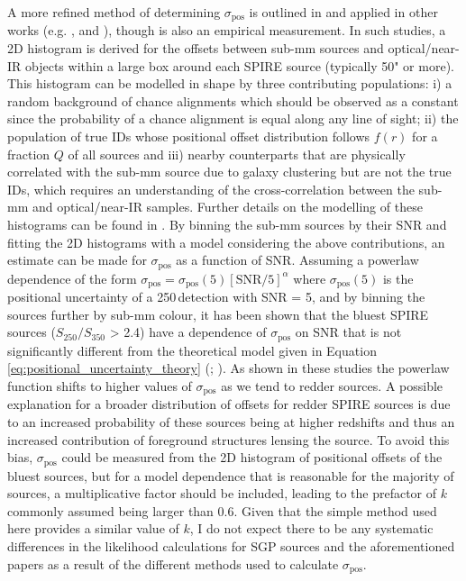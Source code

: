 A more refined method of determining $\sigma_{\textrm{pos}}$ is outlined in \citealt{Smith_2011} and applied in other works (e.g. \citealt{Bourne_2014}, \citealt{Bourne_2016} and \citealt{Furlanetto_2018}), though is also an empirical measurement. In such studies, a 2D histogram is derived for the offsets between sub-mm sources and optical/near-IR objects within a large box around each SPIRE source (typically 50" or more). This histogram can be modelled in shape by three contributing populations: i) a random background of chance alignments which should be observed as a constant since the probability of a chance alignment is equal along any line of sight; ii) the population of true IDs whose positional offset distribution follows $f(r)$ for a fraction $Q$ of all sources and iii) nearby counterparts that are physically correlated with the sub-mm source due to galaxy clustering but are not the true IDs, which requires an understanding of the cross-correlation between the sub-mm and optical/near-IR samples. Further details on the modelling of these histograms can be found in \citealt{Smith_2011}. By binning the sub-mm sources by their SNR and fitting the 2D histograms with a model considering the above contributions, an estimate can be made for $\sigma_{\textrm{pos}}$ as a function of SNR. Assuming a powerlaw dependence of the form $\sigma_{\textrm{pos}} = \sigma_{\textrm{pos}}(5) [\textrm{SNR}/5]^\alpha$ where $\sigma_{\textrm{pos}}(5)$ is the positional uncertainty of a 250\,\micron detection with SNR = 5, and by binning the sources further by sub-mm colour, it has been shown that the bluest SPIRE sources ($S_{250}/S_{350}$ > 2.4) have a dependence of $\sigma_{\textrm{pos}}$ on SNR that is not significantly different from the theoretical model given in Equation \ref{eq:positional_uncertainty_theory} (\citealt{Bourne_2016}; \citealt{Furlanetto_2018}). As shown in these studies the powerlaw function shifts to higher values of $\sigma_{\textrm{pos}}$ as we tend to redder sources. A possible explanation for a broader distribution of offsets for redder SPIRE sources is due to an increased probability of these sources being at higher redshifts and thus an increased contribution of foreground structures lensing the source. To avoid this bias, $\sigma_{\textrm{pos}}$ could be measured from the 2D histogram of positional offsets of the bluest sources, but for a model dependence that is reasonable for the majority of sources, a multiplicative factor should be included, leading to the prefactor of $k$ commonly assumed being larger than 0.6. Given that the simple method used here provides a similar value of $k$, I do not expect there to be any systematic differences in the likelihood calculations for SGP sources and the aforementioned papers as a result of the different methods used to calculate $\sigma_{\textrm{pos}}$.

